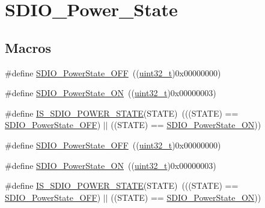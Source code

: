 \hypertarget{group___s_d_i_o___power___state}{}\section{S\+D\+I\+O\+\_\+\+Power\+\_\+\+State}
\label{group___s_d_i_o___power___state}
\subsection*{Macros}
\begin{DoxyCompactItemize}
\item 
\#define \hyperlink{group___s_d_i_o___power___state_gab2f36a68fc50795ea74a7e98b4ac2d37}{S\+D\+I\+O\+\_\+\+Power\+State\+\_\+\+O\+FF}~((\hyperlink{_p_e___types_8h_a33594304e786b158f3fb30289278f5af}{uint32\+\_\+t})0x00000000)
\item 
\#define \hyperlink{group___s_d_i_o___power___state_ga0aacd8c94effe8066c6d447fc884d217}{S\+D\+I\+O\+\_\+\+Power\+State\+\_\+\+ON}~((\hyperlink{_p_e___types_8h_a33594304e786b158f3fb30289278f5af}{uint32\+\_\+t})0x00000003)
\item 
\#define \hyperlink{group___s_d_i_o___power___state_gad0dae767c2024de1769efb1feccc14ef}{I\+S\+\_\+\+S\+D\+I\+O\+\_\+\+P\+O\+W\+E\+R\+\_\+\+S\+T\+A\+TE}(S\+T\+A\+TE)~(((S\+T\+A\+TE) == \hyperlink{openmotestm_2library_2inc_2stm32f10x__sdio_8h_ab2f36a68fc50795ea74a7e98b4ac2d37}{S\+D\+I\+O\+\_\+\+Power\+State\+\_\+\+O\+FF}) $\vert$$\vert$ ((S\+T\+A\+TE) == \hyperlink{openmotestm_2library_2inc_2stm32f10x__sdio_8h_a0aacd8c94effe8066c6d447fc884d217}{S\+D\+I\+O\+\_\+\+Power\+State\+\_\+\+ON}))
\item 
\#define \hyperlink{group___s_d_i_o___power___state_gab2f36a68fc50795ea74a7e98b4ac2d37}{S\+D\+I\+O\+\_\+\+Power\+State\+\_\+\+O\+FF}~((\hyperlink{_p_e___types_8h_a33594304e786b158f3fb30289278f5af}{uint32\+\_\+t})0x00000000)
\item 
\#define \hyperlink{group___s_d_i_o___power___state_ga0aacd8c94effe8066c6d447fc884d217}{S\+D\+I\+O\+\_\+\+Power\+State\+\_\+\+ON}~((\hyperlink{_p_e___types_8h_a33594304e786b158f3fb30289278f5af}{uint32\+\_\+t})0x00000003)
\item 
\#define \hyperlink{group___s_d_i_o___power___state_gad0dae767c2024de1769efb1feccc14ef}{I\+S\+\_\+\+S\+D\+I\+O\+\_\+\+P\+O\+W\+E\+R\+\_\+\+S\+T\+A\+TE}(S\+T\+A\+TE)~(((S\+T\+A\+TE) == \hyperlink{openmotestm_2library_2inc_2stm32f10x__sdio_8h_ab2f36a68fc50795ea74a7e98b4ac2d37}{S\+D\+I\+O\+\_\+\+Power\+State\+\_\+\+O\+FF}) $\vert$$\vert$ ((S\+T\+A\+TE) == \hyperlink{openmotestm_2library_2inc_2stm32f10x__sdio_8h_a0aacd8c94effe8066c6d447fc884d217}{S\+D\+I\+O\+\_\+\+Power\+State\+\_\+\+ON}))
\end{DoxyCompactItemize}


